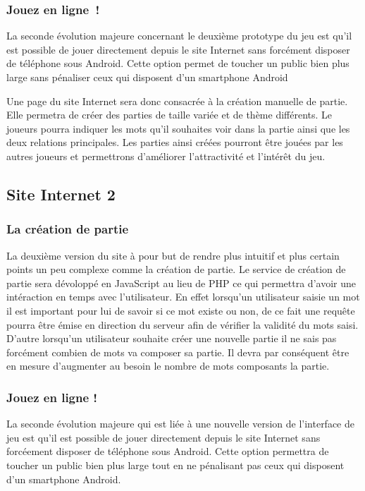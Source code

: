\documentclass[a4paper,11pt,french]{article}
\def\android{Android\texttrademark{}}
\begin{document}
\subsubsection{Jouez en ligne~!}
La seconde évolution majeure concernant le deuxième prototype du jeu est qu'il est possible de jouer directement depuis
le site Internet sans forcément disposer de téléphone sous \android{}. Cette option permet de toucher un public bien plus large sans pénaliser ceux qui disposent d'un smartphone \android{}

Une page du site Internet sera donc consacrée
à la création manuelle de partie. Elle permetra de créer des parties de taille variée et de thème différents. Le joueurs pourra
indiquer les mots qu'il souhaites voir dans la partie ainsi que les deux relations principales.
Les parties ainsi créées pourront être jouées par les autres joueurs et permettrons d'améliorer l'attractivité et l'intérêt du jeu.

\subsection{Site Internet 2}
\subsubsection{La création de partie}
La deuxième version du site à pour but de rendre plus intuitif et plus certain points un peu complexe comme la création de partie.
Le service de création de partie sera dévoloppé en JavaScript au lieu de PHP ce qui permettra d'avoir une intéraction en temps avec l'utilisateur.
En effet lorsqu'un utilisateur saisie un mot il est important pour lui de savoir si ce mot existe ou non, de ce fait une requête pourra être
émise en direction du serveur afin de vérifier la validité du mots saisi. D'autre lorsqu'un utilisateur souhaite créer une nouvelle partie 
il ne sais pas forcément combien de mots va composer sa partie. Il devra par conséquent être en mesure d'augmenter au besoin le nombre de mots
composants la partie.

\subsubsection{Jouez en ligne !}
La seconde évolution majeure qui est liée à une nouvelle version de l'interface de jeu est qu'il est possible de jouer directement depuis
le site Internet sans forcéement disposer de téléphone sous \android{}. Cette option permettra de toucher un public bien plus large tout en 
ne pénalisant pas ceux qui disposent d'un smartphone \android{}.
\end{document}
